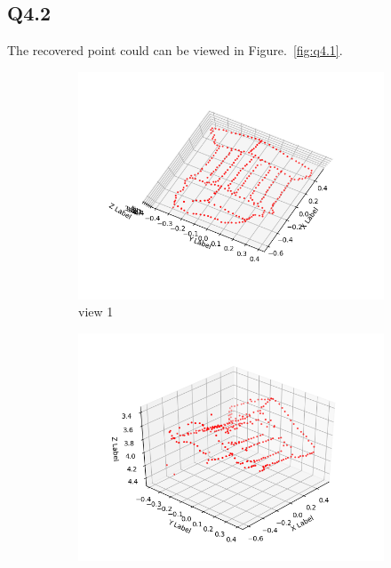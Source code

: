 \documentclass[11pt]{article}
\begin{document}
\newpage

\subsection*{Q4.2}

The recovered point could can be viewed in Figure.~\ref{fig:q4.1}.

\begin{figure}[h!]
    \begin{subfigure}{.49\textwidth}
      \centering
      \includegraphics[width=.95\linewidth]{../results/q4_2_1.png}
      \caption{view 1}
    \end{subfigure}
    \begin{subfigure}{.49\textwidth}
      \centering
      \includegraphics[width=.95\linewidth]{../results/q4_2_2.png}

\end{subfigure}
\end{figure}
\end{document}
